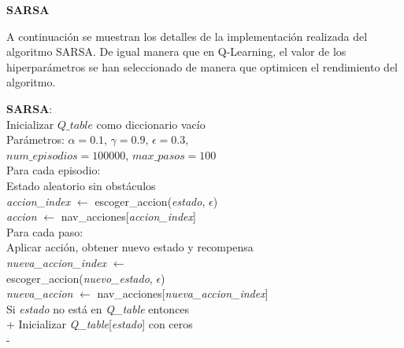 \documentclass[conference,a4paper]{IEEEtran}
\begin{document}
  \textbf{SARSA\newline}

A continuación se muestran los detalles de la implementación realizada del algoritmo SARSA. De igual manera que en Q-Learning, el valor de los hiperparámetros
se han seleccionado de manera que optimicen el rendimiento del algoritmo.

  \begin{minipage}{\linewidth}
    \begin{pseudo}[compact]
      \textbf{SARSA}: \\
      Inicializar $Q\_table$ como diccionario vacío \\
      Parámetros: $\alpha = 0.1$, $\gamma = 0.9$, $\epsilon = 0.3$, \\ $num\_episodios = 100000$, $max\_pasos = 100$ \\
      Para cada episodio: \\
      \> Estado aleatorio sin obstáculos \\
      \> \textit{accion\_index} $\leftarrow$ escoger\_accion(\textit{estado}, $\epsilon$) \\
      \> \textit{accion} $\leftarrow$ nav\_acciones[\textit{accion\_index}] \\
      \> Para cada paso: \\
      \> \> Aplicar acción, obtener nuevo estado y recompensa \\
      \> \> \textit{nueva\_accion\_index} $\leftarrow$ \\
      \> \> \> escoger\_accion(\textit{nuevo\_estado}, $\epsilon$) \\
      \> \> \textit{nueva\_accion} $\leftarrow$ nav\_acciones[\textit{nueva\_accion\_index}] \\
      Si \textit{estado} no está en \textit{Q\_table} entonces \\+
      Inicializar \textit{Q\_table}[\textit{estado}] con ceros \\-
    \end{pseudo}
  \end{minipage}
\end{document}
